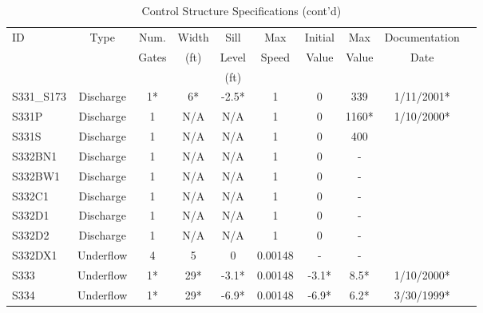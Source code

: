 \scriptsize
\begin{table}[h]
\caption{Control Structure Specifications (cont'd)}
\label{tab:struc-specs3}
\begin{tabular}{@{}lccccccccc@{}}
\toprule
{ID}            & {Type}        & Num.     & Width       & Sill         & Max         & Initial         & Max     & Documentation  \\
                &               & Gates    & (ft)        & Level        & Speed       & Value           & Value   & Date           \\
                &               &          &             & (ft)         &             &                 &         &                \\
\hline
{S331\_S173}    & Discharge     & 1*       & 6*          & -2.5*        & 1           & 0               & 339     & 1/11/2001*  \\
{S331P}         & Discharge     & 1        & N/A         & N/A          & 1           & 0               & 1160*   & 1/10/2000*  \\
{S331S}         & Discharge     & 1        & N/A         & N/A          & 1           & 0               & 400     &             \\
{S332BN1}       & Discharge     & 1        & N/A         & N/A          & 1           & 0               & -       &             \\
{S332BW1}       & Discharge     & 1        & N/A         & N/A          & 1           & 0               & -       &             \\
{S332C1}        & Discharge     & 1        & N/A         & N/A          & 1           & 0               & -       &             \\
{S332D1}        & Discharge     & 1        & N/A         & N/A          & 1           & 0               & -       &             \\
{S332D2}        & Discharge     & 1        & N/A         & N/A          & 1           & 0               & -       &             \\
{S332DX1}       & Underflow     & 4        & 5           & 0            & 0.00148     & -               & -       &             \\
{S333}          & Underflow     & 1*       & 29*         & -3.1*        & 0.00148     & -3.1*           & 8.5*    & 1/10/2000*  \\
{S334}          & Underflow     & 1*       & 29*         & -6.9*        & 0.00148     & -6.9*           & 6.2*    & 3/30/1999*  \\

\end{tabular}
\end{table}

